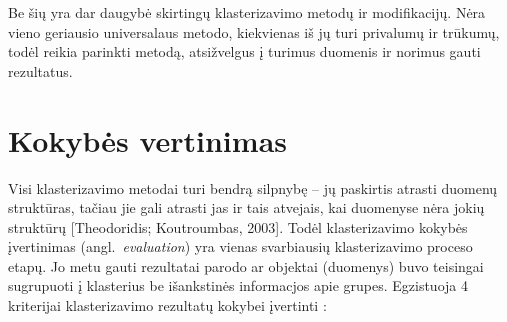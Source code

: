 \documentclass{VUMIFInfKursinis}
\newcommand{\ltang}[2]{#1 (angl.\  \textit{#2}) }
\begin{document}
Be šių yra dar daugybė skirtingų klasterizavimo metodų ir modifikacijų.
Nėra vieno geriausio universalaus metodo, kiekvienas iš jų turi
privalumų ir trūkumų, todėl reikia parinkti metodą, atsižvelgus į
turimus duomenis ir norimus gauti rezultatus.









\section{Kokybės vertinimas}

Visi klasterizavimo metodai turi bendrą silpnybę – jų paskirtis atrasti
duomenų struktūras, tačiau jie gali atrasti jas ir tais atvejais, kai
duomenyse nėra jokių struktūrų {[}Theodoridis; Koutroumbas, 2003{]}.
Todėl klasterizavimo \ltang{kokybės įvertinimas}{evaluation} yra
vienas svarbiausių klasterizavimo proceso etapų. Jo metu gauti
rezultatai parodo ar objektai (duomenys) buvo teisingai sugrupuoti į
klasterius be išankstinės informacjos apie grupes. Egzistuoja 4
kriterijai klasterizavimo rezultatų kokybei įvertinti \cite{feldman2007text}: 
\end{document}
